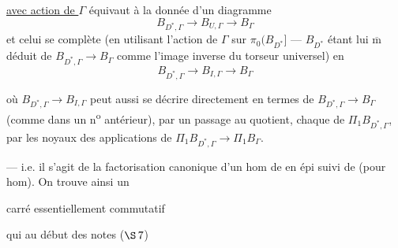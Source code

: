 
\uline{avec action de $\Gamma$} équivaut à la donnée
d'un diagramme
\[
 B_{D^*,\Gamma}\longrightarrow B_{U,\Gamma}\longrightarrow B_\Gamma
\]
et celui se complète (en utilisant
l'action de $\Gamma$ sur $\pi_0(B_{D^*}]$ ---
$B_{D^*}$ étant lui $\overline{\mathrm m}$ déduit de $B_{D^*,\Gamma}\longrightarrow B_\Gamma$
comme l'image inverse du torseur
universel)  en
\[
 B_{D^*,\Gamma}\longrightarrow B_{I,\Gamma}\longrightarrow B_\Gamma
\]

 où $B_{D^*,\Gamma}\longrightarrow B_{I,\Gamma}$ peut aussi se
décrire directement en termes de
$B_{D^*,\Gamma}\longrightarrow B_\Gamma$ (comme dans un n\textsuperscript{o}
antérieur), 
par un passage au
quotient,  chaque 
de $\Pi_1 B_{D^*,\Gamma}$, par les noyaux des applications
 de $\Pi_1 B_{D^*,\Gamma}\longrightarrow\Pi_1 B_\Gamma$.

--- i.e. il s'agit de la factorisation
canonique d'un hom de 
en \unsure{(} épi
 \unsure{)} suivi de 
(pour hom). On trouve ainsi un


carré essentiellement commutatif

qui 
au début des notes  \deleted{\unsure{$\Pi$}}  ($\S\,7$)

